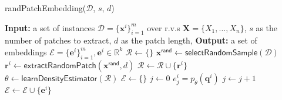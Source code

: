 \documentclass{beamer}
\begin{document}




\begin{frame}
  \begin{algorithm}[H]
    \caption{randPatchEmbedding($\mathcal{D}$, $s$,
      $d$)}\label{rand-ii}
    \small
    \begin{algorithmic}[1]
      \State \textbf{Input:} a set of instances
      $\mathcal{D}=\{\mathbf{x}^{i}\}_{i=1}^{m}$ over r.v.s
      $\mathbf{X}=\{X_1,\dots,X_n\}$,
      $s$ as the number of patches to extract,
      $d$ as the patch length,
      \State  \textbf{Output:}  a set of embeddings
      $\mathcal{E}=\{\mathbf{e}^{i}\}_{i=1}^{m}, \mathbf{e}^{i}\in\mathbb{R}^{k}$
      \State $\mathcal{R}\leftarrow\{\}$
      \State $\mathbf{x}^{\mathsf{rand}}\leftarrow
      \mathsf{selectRandomSample}(\mathcal{D})$
      \State $\mathbf{r}^{i}\leftarrow
      \mathsf{extractRandomPatch}(\mathbf{x}^{\mathsf{rand}}, d)$
      \State $\mathcal{R}\leftarrow\mathcal{R}\cup\{\mathbf{r}^{i}\}$
      \EndFor
      \State $\theta\leftarrow\mathsf{learnDensityEstimator}(\mathcal{R})$
      \State $\mathcal{E}\leftarrow\{\}$
      \State $j\leftarrow 0$
      \State $e^{i}_{j}= p_{\theta}(\mathbf{q}^{i})$
      \State $j\leftarrow j + 1$
      \EndFor
      \State $\mathcal{E}\leftarrow\mathcal{E}\cup\{\mathbf{e}^{i}\}$
      \EndFor
    \end{algorithmic}
    \label{alg_1}
  \end{algorithm}
\end{frame}
\end{document}
